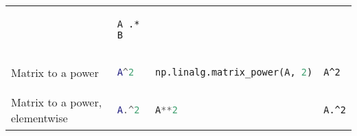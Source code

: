 \documentclass[10pt, landscape]{article}
\begin{document}
\begin{multicols}{2}
\begin{tabular}[]{@{}llll@{}}
\begin{minipage}[t]{0.23\columnwidth}
\end{minipage} & \begin{minipage}[t]{0.20\columnwidth}\raggedright
\begin{lstlisting}
A .* B
\end{lstlisting}

\end{minipage}\tabularnewline
\begin{minipage}[t]{0.23\columnwidth}\raggedright
Matrix to a power
\end{minipage} & \begin{minipage}[t]{0.22\columnwidth}\raggedright
\begin{lstlisting}[language=Matlab]
A^2
\end{lstlisting}

\end{minipage} & \begin{minipage}[t]{0.23\columnwidth}\raggedright
\begin{lstlisting}[language=Python]
np.linalg.matrix_power(A, 2)
\end{lstlisting}

\end{minipage} & \begin{minipage}[t]{0.20\columnwidth}\raggedright
\begin{lstlisting}
A^2
\end{lstlisting}

\end{minipage}\tabularnewline
\begin{minipage}[t]{0.23\columnwidth}\raggedright
Matrix to a power, elementwise
\end{minipage} & \begin{minipage}[t]{0.22\columnwidth}\raggedright
\begin{lstlisting}[language=Matlab]
A.^2
\end{lstlisting}

\end{minipage} & \begin{minipage}[t]{0.23\columnwidth}\raggedright
\begin{lstlisting}[language=Python]
A**2
\end{lstlisting}

\end{minipage} & \begin{minipage}[t]{0.20\columnwidth}\raggedright
\begin{lstlisting}
A.^2
\end{lstlisting}


\end{minipage}
\end{tabular}
\end{multicols}
\end{document}
